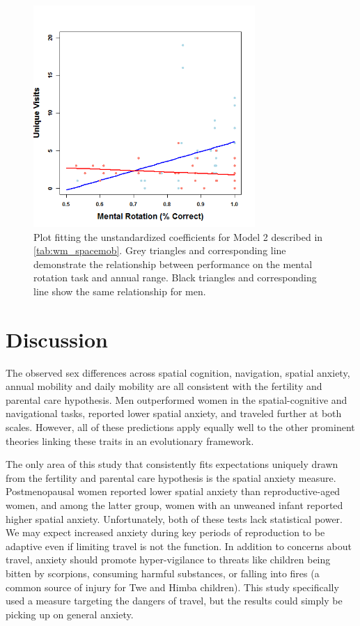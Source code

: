\begin{figure}[!htb]
  \includegraphics[width=0.75\textwidth]{mw_acctot}
\caption{Plot fitting the unstandardized coefficients for Model 2 described in \ref{tab:wm_spacemob}. Grey triangles and corresponding line demonstrate the relationship between performance on the mental rotation task and annual range.  Black triangles and corresponding line show the same relationship for men.}
\label{fig:1}       %
\end{figure}

\section{Discussion}
\label{sec:4}

The observed sex differences across spatial cognition, navigation, spatial anxiety, annual mobility and daily mobility are all consistent with the fertility and parental care hypothesis.  Men outperformed women in the spatial-cognitive and navigational tasks, reported lower spatial anxiety, and traveled further at both scales.  However, all of these predictions apply equally well to the other prominent theories linking these traits in an evolutionary framework.  

The only area of this study that consistently fits expectations uniquely drawn from the fertility and parental care hypothesis is the spatial anxiety measure.  Postmenopausal women reported lower spatial anxiety than reproductive-aged women, and among the latter group, women with an unweaned infant reported higher spatial anxiety.  Unfortunately, both of these tests lack statistical power.  We may expect increased anxiety during key periods of reproduction to be adaptive even if limiting travel is not the function.  In addition to concerns about travel, anxiety should promote hyper-vigilance to threats like children being bitten by scorpions, consuming harmful substances, or falling into fires (a common source of injury for Twe and Himba children).  This study specifically used a measure targeting the dangers of travel, but the results could simply be picking up on general anxiety.

